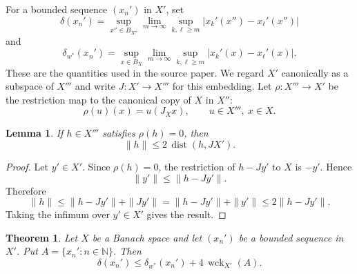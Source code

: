 \documentclass[11pt]{amsart}
\newtheorem{theorem}{Theorem}
\newtheorem{lemma}{Lemma}
\newcommand{\N}{\mathbb N}
\newcommand{\B}{B}
\newcommand{\dist}{\operatorname{dist}}
\newcommand{\wck}{\operatorname{wck}}
\begin{document}
For a bounded sequence $(x_n')$ in $X'$, set
\[
\delta(x_n')
= \sup_{x''\in \B_{X''}}
   \lim_{m\to\infty}\sup_{k,\ell\ge m}
   |x_k'(x'')-x_\ell'(x'')|
\]
and
\[
\delta_{w^*}(x_n')
= \sup_{x\in \B_X}
   \lim_{m\to\infty}\sup_{k,\ell\ge m}
   |x_k'(x)-x_\ell'(x)|.
\]
These are the quantities used in the source paper. We regard $X'$ canonically
as a subspace of $X'''$ and write $J:X'\to X'''$ for this embedding. Let
$\rho:X'''\to X'$ be the restriction map to the canonical copy of $X$ in $X''$:
\[
  \rho(u)(x)=u(J_Xx),\qquad u\in X''',\ x\in X.
\]

\begin{lemma}
\label{lem:annihilator}
If $h\in X'''$ satisfies $\rho(h)=0$, then
\[
  \|h\| \le 2\,\dist(h,JX').
\]
\end{lemma}

\begin{proof}
Let $y'\in X'$. Since $\rho(h)=0$, the restriction of $h-Jy'$ to $X$ is
$-y'$. Hence
\[
  \|y'\| \le \|h-Jy'\|.
\]
Therefore
\[
  \|h\| \le \|h-Jy'\|+\|Jy'\|
       = \|h-Jy'\|+\|y'\|
       \le 2\|h-Jy'\|.
\]
Taking the infimum over $y'\in X'$ gives the result.
\end{proof}

\begin{theorem}
\label{thm:main-inequality}
Let $X$ be a Banach space and let $(x_n')$ be a bounded sequence in $X'$. Put
$A=\{x_n':n\in\N\}$. Then
\[
  \delta(x_n') \le \delta_{w^*}(x_n')+4\,\wck_{X'}(A).
\]
\end{theorem}
\end{document}
